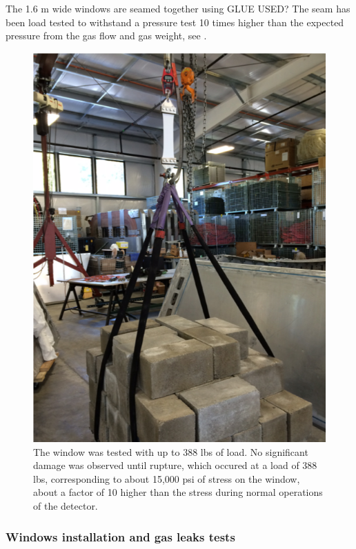 The 1.6 m wide windows are seamed together using GLUE USED? The seam has been load tested to withstand a pressure test 10 times
higher than the expected pressure from the gas flow and gas weight, see .


\begin{figure}
	\centering
	\includegraphics[width=1.0\columnwidth,keepaspectratio]{img/windowTest.png}
	\caption{The window was tested with up to 388 lbs of load. No significant damage was observed until rupture, which occured at a load of 388 lbs,
			   corresponding to about 15,000 psi of stress on the window, about a factor of 10 higher than the stress during normal operations of the detector.}
	\label{fig:windowTest}
\end{figure}

\subsubsection{Windows installation and gas leaks tests}

